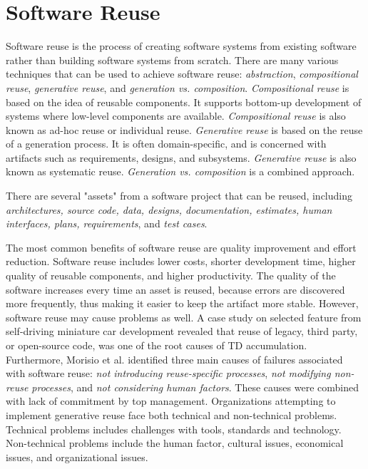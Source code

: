 
\section{Software Reuse}
\label{sec:reuse}
Software reuse is the process of creating software systems from existing software rather than building software systems from scratch\cite{krueger1992software,frakes1996software}. There are many various techniques that can be used to achieve software reuse: \textit{abstraction}, \textit{compositional reuse}, \textit{generative reuse}, and \textit{generation vs. composition}\cite{sametinger1997software}. \textit{Compositional reuse} is based on the idea of reusable components. It supports bottom-up development of systems where low-level components are available. \textit{Compositional reuse} is also known as ad-hoc reuse or individual reuse. \textit{Generative reuse} is based on the reuse of a generation process. It is often domain-specific, and is concerned with artifacts such as requirements, designs, and subsystems\cite{frakes1994systematic}. \textit{Generative reuse} is also known as systematic reuse\cite{frakes1994systematic}. \textit{Generation vs. composition} is a combined approach. 

There are several "assets" from a software project that can be reused, including \textit{architectures, source code, data, designs, documentation, estimates, human interfaces, plans, requirements}, and \textit{test cases}\cite{frakes1996software}.

The most common benefits of software reuse are quality improvement and effort reduction. Software reuse includes lower costs, shorter development time, higher quality of reusable components, and higher productivity\cite{Slyngstad:2006:ESD:1159733.1159770,lim1994effects}. The quality of the software increases every time an asset is reused, because errors are discovered more frequently, thus making it easier to keep the artifact more stable\cite{sametinger1997software}. However, software reuse may cause problems as well. A case study on selected feature from self-driving miniature car development revealed that reuse of legacy, third party, or open-source code, was one of the root causes of TD accumulation\cite{6974884}. Furthermore, Morisio et al.\cite{995420} identified three main causes of failures associated with software reuse: \textit{not introducing reuse-specific processes}, \textit{not modifying non-reuse processes}, and \textit{not considering human factors}. These causes were combined with lack of commitment by top management. Organizations attempting to implement generative reuse face both technical and non-technical problems\cite{frakes1994success}. Technical problems includes challenges with tools, standards and technology. Non-technical problems include the human factor, cultural issues, economical issues, and organizational issues. 




